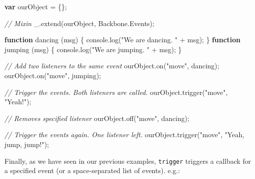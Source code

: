 \documentclass[9pt]{book}
\newenvironment{Shaded}{}{}
\newcommand{\KeywordTok}[1]{\textcolor[rgb]{0.00,0.44,0.13}{\textbf{{#1}}}}
\newcommand{\StringTok}[1]{\textcolor[rgb]{0.25,0.44,0.63}{{#1}}}
\newcommand{\CommentTok}[1]{\textcolor[rgb]{0.38,0.63,0.69}{\textit{{#1}}}}
\newcommand{\OtherTok}[1]{\textcolor[rgb]{0.00,0.44,0.13}{{#1}}}
\newcommand{\FunctionTok}[1]{\textcolor[rgb]{0.02,0.16,0.49}{{#1}}}
\newcommand{\NormalTok}[1]{{#1}}
\begin{document}
\begin{Shaded}
\begin{Highlighting}[]
\KeywordTok{var} \NormalTok{ourObject = \{\};}

\CommentTok{// Mixin}
\OtherTok{_}\NormalTok{.}\FunctionTok{extend}\NormalTok{(ourObject, }\OtherTok{Backbone}\NormalTok{.}\FunctionTok{Events}\NormalTok{);}

\KeywordTok{function} \FunctionTok{dancing} \NormalTok{(msg) \{ }\OtherTok{console}\NormalTok{.}\FunctionTok{log}\NormalTok{(}\StringTok{"We are dancing. "} \NormalTok{+ msg); \}}
\KeywordTok{function} \FunctionTok{jumping} \NormalTok{(msg) \{ }\OtherTok{console}\NormalTok{.}\FunctionTok{log}\NormalTok{(}\StringTok{"We are jumping. "} \NormalTok{+ msg); \}}

\CommentTok{// Add two listeners to the same event}
\OtherTok{ourObject}\NormalTok{.}\FunctionTok{on}\NormalTok{(}\StringTok{"move"}\NormalTok{, dancing);}
\OtherTok{ourObject}\NormalTok{.}\FunctionTok{on}\NormalTok{(}\StringTok{"move"}\NormalTok{, jumping);}

\CommentTok{// Trigger the events. Both listeners are called.}
\OtherTok{ourObject}\NormalTok{.}\FunctionTok{trigger}\NormalTok{(}\StringTok{"move"}\NormalTok{, }\StringTok{"Yeah!"}\NormalTok{);}

\CommentTok{// Removes specified listener}
\OtherTok{ourObject}\NormalTok{.}\FunctionTok{off}\NormalTok{(}\StringTok{"move"}\NormalTok{, dancing);}

\CommentTok{// Trigger the events again. One listener left.}
\OtherTok{ourObject}\NormalTok{.}\FunctionTok{trigger}\NormalTok{(}\StringTok{"move"}\NormalTok{, }\StringTok{"Yeah, jump, jump!"}\NormalTok{);}
\end{Highlighting}
\end{Shaded}

Finally, as we have seen in our previous examples, \texttt{trigger}
triggers a callback for a specified event (or a space-separated list of
events). e.g.:
\end{document}
